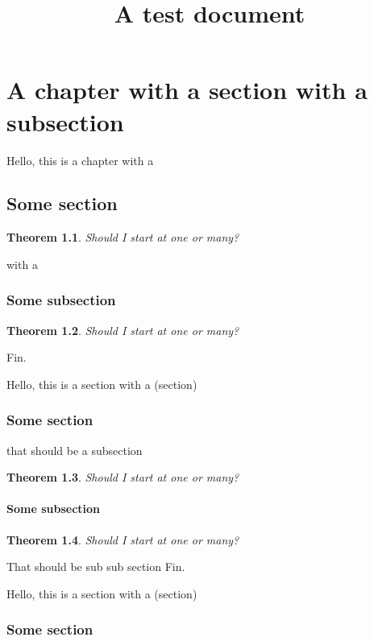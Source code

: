 \documentclass{report}
\title{A test document}
\newtheorem{theorem}{Theorem}
\begin{document}
\tableofcontents
\chapter{A chapter with a section with a subsection}


Hello, this is a chapter with a

\section{Some section}


\begin{theorem}
  Should I start at one or many?
\end{theorem}
with a

\subsection{Some subsection}

\begin{theorem}
  Should I start at one or many?
\end{theorem}



Fin.




Hello, this is a section with a (section)

\subsection{Some section}

that should be a subsection


\begin{theorem}
  Should I start at one or many?
\end{theorem}

\subsubsection{Some subsection}

\begin{theorem}
  Should I start at one or many?
\end{theorem}


That should be sub sub section
Fin.




Hello, this is a section with a (section)

\subsection{Some section}
\end{document}
